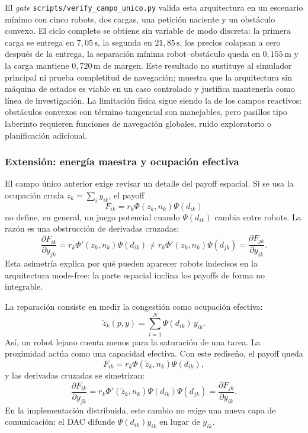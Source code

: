 El \emph{gate} \texttt{scripts/verify\_campo\_unico.py} valida esta arquitectura en un
escenario mínimo con cinco robots, dos cargas, una petición naciente y un obstáculo
convexo. El ciclo completo se obtiene sin variable de modo discreta: la primera carga se
entrega en $7{,}05\,\text{s}$, la segunda en $21{,}85\,\text{s}$, los precios colapsan a
cero después de la entrega, la separación mínima robot--obstáculo queda en
$0{,}155\,\text{m}$ y la carga mantiene $0{,}720\,\text{m}$ de margen. Este resultado no
sustituye al simulador principal ni prueba completitud de navegación; muestra que la
arquitectura sin máquina de estados es viable en un caso controlado y justifica
mantenerla como línea de investigación. La limitación física sigue siendo la de los
campos reactivos: obstáculos convexos con término tangencial son manejables, pero
pasillos tipo laberinto requieren funciones de navegación globales, ruido exploratorio o
planificación adicional.

\subsubsection{Extensión: energía maestra y ocupación efectiva}
\label{subsubsec:energia_maestra}

El campo único anterior exige revisar un detalle del payoff espacial. Si se usa la
ocupación cruda $z_k=\sum_i y_{ik}$, el payoff
\[
  F_{ik}=r_k\Phi(z_k,n_k)\Psi(d_{ik})
\]
no define, en general, un juego potencial cuando $\Psi(d_{ik})$ cambia entre robots. La
razón es una obstrucción de derivadas cruzadas:
\[
  \frac{\partial F_{ik}}{\partial y_{jk}}
  = r_k\Phi'(z_k,n_k)\Psi(d_{ik})
  \neq
  r_k\Phi'(z_k,n_k)\Psi(d_{jk})
  =
  \frac{\partial F_{jk}}{\partial y_{ik}} .
  \label{eq:obstruccion_psi}
\]
Esta asimetría explica por qué pueden aparecer robots indecisos en la arquitectura
mode-free: la parte espacial inclina los payoffs de forma no integrable.

La reparación consiste en medir la congestión como ocupación efectiva:
\begin{equation}
  \tilde z_k(p,y)=\sum_{i=1}^{N}\Psi(d_{ik})\,y_{ik}.
  \label{eq:ocupacion_efectiva}
\end{equation}
Así, un robot lejano cuenta menos para la saturación de una tarea. La proximidad actúa
como una capacidad efectiva. Con este rediseño, el payoff queda
\begin{equation}
  F_{ik}=r_k\Phi(\tilde z_k,n_k)\Psi(d_{ik}),
  \label{eq:payoff_efectivo}
\end{equation}
y las derivadas cruzadas se simetrizan:
\[
  \frac{\partial F_{ik}}{\partial y_{jk}}
  =
  r_k\Phi'(\tilde z_k,n_k)\Psi(d_{ik})\Psi(d_{jk})
  =
  \frac{\partial F_{jk}}{\partial y_{ik}} .
\]
En la implementación distribuida, este cambio no exige una nueva capa de comunicación:
el DAC difunde $\Psi(d_{ik})y_{ik}$ en lugar de $y_{ik}$.

